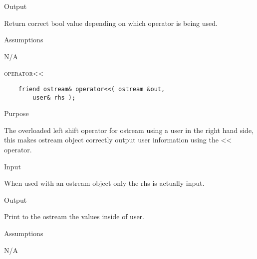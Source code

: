 \documentclass[pdftex, 12pt]{article}
\begin{document}
\begin{description}
\begin{description}
			\item{Output}

				Return correct bool value depending on which operator is being used.

			\item{Assumptions}

				N/A

		\end{description}

	\item{\textsc{operator<<}}
\begin{lstlisting}
	friend ostream& operator<<( ostream &out,
		user& rhs );
\end{lstlisting}
		\begin{description}

			\item{Purpose}

				The overloaded left shift operator for ostream using a user in the right hand side, this makes ostream
				object correctly output user information using the << operator.

			\item{Input}

				When used with an ostream object only the rhs is actually input.

			\item{Output}

				Print to the ostream the values inside of user.

			\item{Assumptions}

				N/A

		\end{description}

\end{description}
\end{document}
